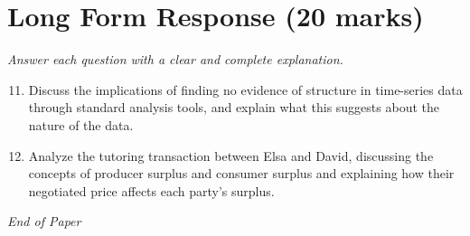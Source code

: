 \documentclass[12pt]{article}
\begin{document}
\section*{Long Form Response (20 marks)}
\textit{Answer each question with a clear and complete explanation.}
\begin{enumerate}[label=\arabic*.]
\setcounter{enumi}{10}
\item Discuss the implications of finding no evidence of structure in time-series data through standard analysis tools, and explain what this suggests about the nature of the data.
\item Analyze the tutoring transaction between Elsa and David, discussing the concepts of producer surplus and consumer surplus and explaining how their negotiated price affects each party's surplus.
\end{enumerate}

\vfill
\noindent\textit{End of Paper}
\end{document}
